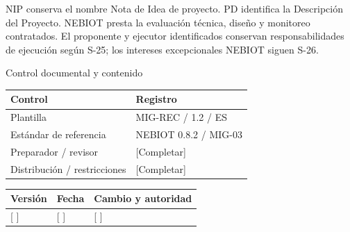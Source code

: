 \vspace{2mm}
NIP conserva el nombre Nota de Idea de proyecto. PD identifica la Descripción del Proyecto.
\vspace{2mm}
NEBIOT presta la evaluación técnica, diseño y monitoreo contratados. El proponente y ejecutor identificados conservan responsabilidades de ejecución según S-25; los intereses excepcionales NEBIOT siguen S-26.
\clearpage
{\fontsize{23}{27}\selectfont\color{NEBGreen}Control documental y contenido\par}
\vspace{3mm}
{\sffamily\fontsize{8.3}{10.3}\selectfont\begin{longtable}{@{}P{50.55mm} P{117.94mm}@{}}
\toprule
\textbf{Control} & \textbf{Registro}\\\midrule\endhead
\rule{0pt}{7.7mm}Plantilla & MIG-REC / 1.2 / ES\\\hline
\rule{0pt}{7.7mm}Estándar de referencia & NEBIOT 0.8.2 / MIG-03\\\hline
\rule{0pt}{7.7mm}Preparador / revisor & [Completar]\\\hline
\rule{0pt}{7.7mm}Distribución / restricciones & [Completar]\\\hline
\end{longtable}}
{\sffamily\fontsize{8.3}{10.3}\selectfont\begin{longtable}{@{}P{31.34mm} P{37.94mm} P{95.68mm}@{}}
\toprule
\textbf{Versión} & \textbf{Fecha} & \textbf{Cambio y autoridad}\\\midrule\endhead
\rule{0pt}{7.7mm}[ ] & [ ] & [ ]\\\hline
\end{longtable}}
{\sffamily\fontsize{9.5}{11.4}\selectfont\tableofcontents}

